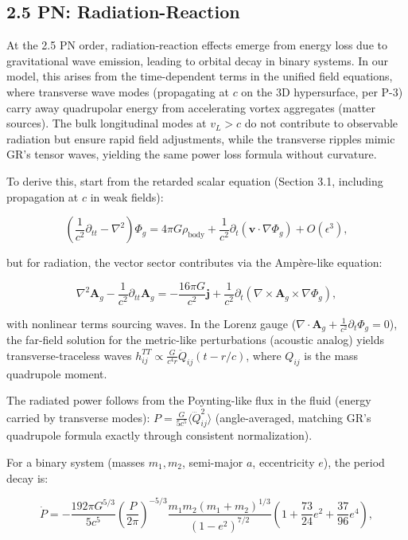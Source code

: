 \subsection{2.5 PN: Radiation-Reaction}

At the 2.5 PN order, radiation-reaction effects emerge from energy loss due to gravitational wave emission, leading to orbital decay in binary systems. In our model, this arises from the time-dependent terms in the unified field equations, where transverse wave modes (propagating at $c$ on the 3D hypersurface, per P-3) carry away quadrupolar energy from accelerating vortex aggregates (matter sources). The bulk longitudinal modes at $v_L > c$ do not contribute to observable radiation but ensure rapid field adjustments, while the transverse ripples mimic GR's tensor waves, yielding the same power loss formula without curvature.

To derive this, start from the retarded scalar equation (Section 3.1, including propagation at $c$ in weak fields):

\[
\left( \frac{1}{c^2} \partial_{tt} - \nabla^2 \right) \Phi_g = 4\pi G \rho_{\text{body}} + \frac{1}{c^2} \partial_t (\mathbf{v} \cdot \nabla \Phi_g) + O(\epsilon^3),
\]

but for radiation, the vector sector contributes via the Ampère-like equation:

\[
\nabla^2 \mathbf{A}_g - \frac{1}{c^2} \partial_{tt} \mathbf{A}_g = -\frac{16\pi G}{c^2} \mathbf{j} + \frac{1}{c^2} \partial_t (\nabla \times \mathbf{A}_g \times \nabla \Phi_g),
\]

with nonlinear terms sourcing waves. In the Lorenz gauge ($\nabla \cdot \mathbf{A}_g + \frac{1}{c^2} \partial_t \Phi_g = 0$), the far-field solution for the metric-like perturbations (acoustic analog) yields transverse-traceless waves $h_{ij}^{TT} \propto \frac{G}{c^4 r} \ddot{Q}_{ij}(t - r/c)$, where $Q_{ij}$ is the mass quadrupole moment.

The radiated power follows from the Poynting-like flux in the fluid (energy carried by transverse modes): $P = \frac{G}{5 c^5} \langle \dddot{Q}_{ij}^2 \rangle$ (angle-averaged, matching GR's quadrupole formula exactly through consistent normalization).

For a binary system (masses $m_1, m_2$, semi-major $a$, eccentricity $e$), the period decay is:

\[
\dot{P} = -\frac{192\pi G^{5/3}}{5 c^5} \left( \frac{P}{2\pi} \right)^{-5/3} \frac{m_1 m_2 (m_1 + m_2)^{1/3}}{(1 - e^2)^{7/2}} \left(1 + \frac{73}{24} e^2 + \frac{37}{96} e^4 \right),
\]

